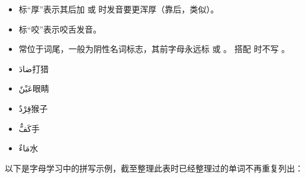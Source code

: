 \begin{itemize}
    \item 标``厚''表示其后加  或  时发音要更浑厚（靠后，类似\textipa{[A]}）。
    \item 标``咬''表示咬舌发音。
    \item {} 常位于词尾，一般为阴性名词标志，其前字母永远标  或  。 搭配  时不写 。
    \item \ac{ضادَ}{打猎}
    \item \ac{عَيْنٌ}{眼睛} 
    \item \ac{قِرْدٌ}{猴子}
    \item \ac{كَفٌّ}{手}
    \item \ac{مَاءٌ}{水}
\end{itemize}

以下是字母学习中的拼写示例，截至整理此表时已经整理过的单词不再重复列出：

